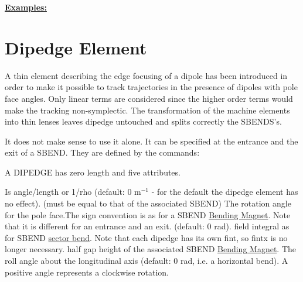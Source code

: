 {\bf \underline {Examples:}}



\section{Dipedge Element}
\label{sec:dipedge}

A thin element describing the edge focusing of a dipole has been
introduced in order to make it possible to track trajectories in the
presence of dipoles with pole face angles. Only linear terms are
considered since the higher order terms would make the tracking
non-symplectic. The transformation of the machine elements into thin
lenses leaves dipedge untouched and splits correctly the SBENDS's.  

It does not make sense to use it alone. It can be specified at the
entrance and the exit of a SBEND. They are defined by the commands:  

A DIPEDGE has zero length and five attributes. 
\begin{madlist}
    Is angle/length or 1/rho (default: 0 m$^{-1}$ - for the
     default the dipedge element has no effect). (must be equal to that
     of the associated SBEND)  
    The rotation angle for the pole face.The sign convention is
     as for a SBEND \href{bend.html}{Bending Magnet}. Note that it is
     different for an entrance and an exit. (default: 0 rad).  
    field integral as for SBEND
     \href{local_system.html#sbend}{sector bend}. Note that each dipedge
     has its own fint, so fintx is no longer necessary.  
    half gap height of the associated SBEND
     \href{bend.html}{Bending Magnet}.   
    The roll angle about the longitudinal axis (default: 0
     rad, i.e. a horizontal bend). A positive angle represents a
     clockwise rotation.  
\end{madlist}



